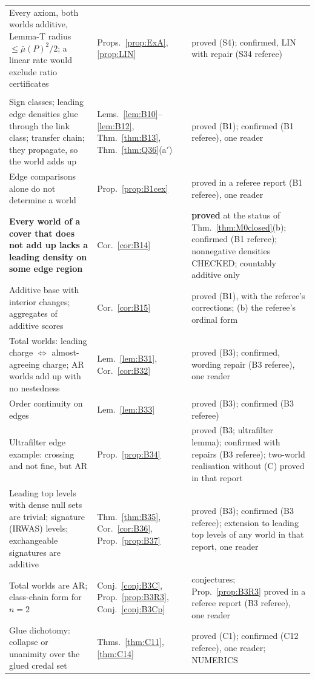 \documentclass[11pt]{article}
\theoremstyle{definition}
\theoremstyle{remark}
\begin{document}
{\begin{longtable}{>{\raggedright\arraybackslash}p{6.4cm}>{\raggedright\arraybackslash}p{2.1cm}>{\raggedright\arraybackslash}p{5.6cm}}
Every axiom, both worlds additive, Lemma-T radius $\le\bar\mu(P)^2/2$; a linear rate would exclude ratio certificates & Props.~\ref{prop:ExA}, \ref{prop:LIN} & proved (S4); confirmed, LIN with repair (S34 referee)\\
\multicolumn{3}{l}{\emph{Rounds 14--15} (\S\ref{sec:open-core}(f); round-15 results refereed once, C12 referee)}\\
Sign classes; leading edge densities glue through the link class; transfer chain; they propagate, so the world adds up & Lems.~\ref{lem:B10}--\ref{lem:B12}, Thm.~\ref{thm:B13}, Thm.~\ref{thm:Q36}(a$'$) & proved (B1); confirmed (B1 referee), one reader\\
Edge comparisons alone do not determine a world & Prop.~\ref{prop:B1cex} & proved in a referee report (B1 referee), one reader\\
\textbf{Every world of a cover that does not add up lacks a leading density on some edge region} & Cor.~\ref{cor:B14} & \textbf{proved} at the status of Thm.~\ref{thm:M0closed}(b); confirmed (B1 referee); nonnegative densities CHECKED; countably additive only\\
Additive base with interior changes; aggregates of additive scores & Cor.~\ref{cor:B15} & proved (B1), with the referee's corrections; (b) the referee's ordinal form\\
Total worlds: leading charge $\iff$ almost-agreeing charge; AR worlds add up with no nestedness & Lem.~\ref{lem:B31}, Cor.~\ref{cor:B32} & proved (B3); confirmed, wording repair (B3 referee), one reader\\
Order continuity on edges & Lem.~\ref{lem:B33} & proved (B3); confirmed (B3 referee)\\
Ultrafilter edge example: crossing and not fine, but AR & Prop.~\ref{prop:B34} & proved (B3; ultrafilter lemma); confirmed with repairs (B3 referee); two-world realisation without (C) proved in that report\\
Leading top levels with dense null sets are trivial; signature (IRWAS) levels; exchangeable signatures are additive & Thm.~\ref{thm:B35}, Cor.~\ref{cor:B36}, Prop.~\ref{prop:B37} & proved (B3); confirmed (B3 referee); extension to leading top levels of any world in that report, one reader\\
Total worlds are AR; class-chain form for $n=2$ & Conj.~\ref{conj:B3C}, Prop.~\ref{prop:B3R3}, Conj.~\ref{conj:B3Cp} & conjectures; Prop.~\ref{prop:B3R3} proved in a referee report (B3 referee), one reader\\
Glue dichotomy: collapse or unanimity over the glued credal set & Thms.~\ref{thm:C11}, \ref{thm:C14} & proved (C1); confirmed (C12 referee), one reader; NUMERICS\\

\end{longtable}}
\end{document}
